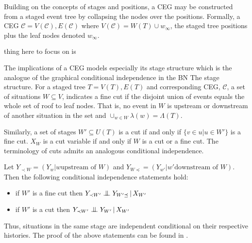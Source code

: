 \documentclass[12pt]{article}
\newcommand{\bigCI}{\mathrel{\text{\scalebox{1.07}{$\perp\mkern-10mu\perp$}}}}
\begin{document}
Building on the concepts of stages and positions, a CEG may be constructed from a staged event tree by collapsing the nodes over the positions. Formally, a CEG $\mathcal{C} = V(\mathcal{C}), E(\mathcal{C})$ where $V(\mathcal{C}) = W(T) \cup w_\infty$, the staged tree positions plus the leaf nodes denoted $w_\infty$. 

thing here to focus on is


The implications of a CEG models especially its stage structure which
is the analogue of the graphical conditional independence in the BN
\cite{Dawid 1979} \cite{Studen 2005} The stage structure. For a staged tree $T = V(T), E(T)$ and corresponding CEG, $\mathcal{C}$, a set of situations $W \subseteq V$, indicates a fine cut if the disjoint union of events equals the whole set of roof to leaf nodes. That is, no event in $W$ is upstream or downstream of another situation in the set and $\cup_{w \in W} \lambda(w) = \Lambda (T)$.

Similarly, a set of stages $W' \subseteq U(T)$ is a cut if and only if $\{ v \in u | u \in W'\} $ is a fine cut. $X_W$ is a cut variable if and only if  $W$ is a cut or a fine cut. The terminology of cuts admits an analogous conditional independence. 

Let $Y_{\prec W} = (Y_w | w \text{upstream of } W)$ and $ Y_{W\preceq} = (Y_{w'}  | w' \text{downstream of } W) $. Then the following conditional independence statements hold:  

\begin{itemize}
	\item if $W'$ is a fine cut then $Y_{\prec W'} \bigCI Y_{W'\preceq} \,|\, X_{W'}$ 
	\item if $W'$ is a cut then $Y_{\prec W'} \bigCI Y_{W'} \,|\, X_{W'}$ 
\end{itemize}

Thus, situations in the same stage are independent conditional on their respective histories. The proof of the above statements can be found in \cite{SmithAnderson} \cite{ThwaitesSmith}.


  
\end{document}
